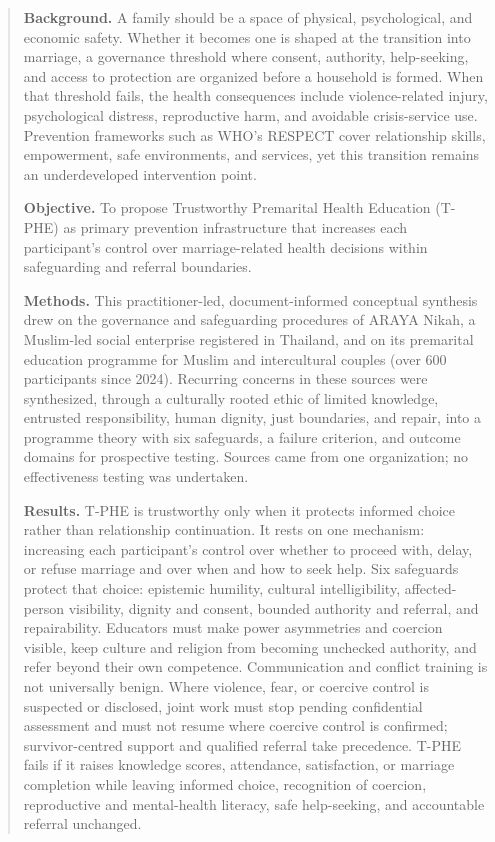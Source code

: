 \documentclass[11pt]{article}
\begin{document}
\begin{quotation}
\noindent\textbf{Background.} A family should be a space of physical, psychological, and economic safety. Whether it becomes one is shaped at the transition into marriage, a governance threshold where consent, authority, help-seeking, and access to protection are organized before a household is formed. When that threshold fails, the health consequences include violence-related injury, psychological distress, reproductive harm, and avoidable crisis-service use. Prevention frameworks such as WHO's RESPECT cover relationship skills, empowerment, safe environments, and services, yet this transition remains an underdeveloped intervention point.

\textbf{Objective.} To propose Trustworthy Premarital Health Education (T-PHE) as primary prevention infrastructure that increases each participant's control over marriage-related health decisions within safeguarding and referral boundaries.

\textbf{Methods.} This practitioner-led, document-informed conceptual synthesis drew on the governance and safeguarding procedures of ARAYA Nikah, a Muslim-led social enterprise registered in Thailand, and on its premarital education programme for Muslim and intercultural couples (over 600 participants since 2024). Recurring concerns in these sources were synthesized, through a culturally rooted ethic of limited knowledge, entrusted responsibility, human dignity, just boundaries, and repair, into a programme theory with six safeguards, a failure criterion, and outcome domains for prospective testing. Sources came from one organization; no effectiveness testing was undertaken.

\textbf{Results.} T-PHE is trustworthy only when it protects informed choice rather than relationship continuation. It rests on one mechanism: increasing each participant's control over whether to proceed with, delay, or refuse marriage and over when and how to seek help. Six safeguards protect that choice: epistemic humility, cultural intelligibility, affected-person visibility, dignity and consent, bounded authority and referral, and repairability. Educators must make power asymmetries and coercion visible, keep culture and religion from becoming unchecked authority, and refer beyond their own competence. Communication and conflict training is not universally benign. Where violence, fear, or coercive control is suspected or disclosed, joint work must stop pending confidential assessment and must not resume where coercive control is confirmed; survivor-centred support and qualified referral take precedence. T-PHE fails if it raises knowledge scores, attendance, satisfaction, or marriage completion while leaving informed choice, recognition of coercion, reproductive and mental-health literacy, safe help-seeking, and accountable referral unchanged.


\end{quotation}
\end{document}
